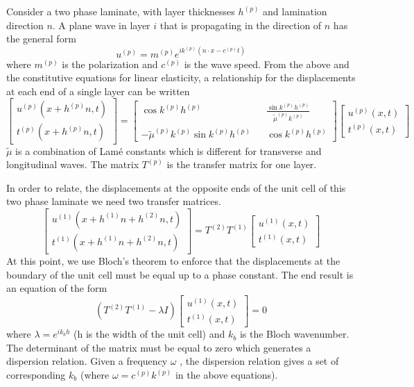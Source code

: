 \documentclass{article}
\begin{document}
Consider a two phase laminate, with layer thicknesses $h^{(p)}$ and lamination 
direction $n$. A plane wave in layer $i$ that is propagating in the direction 
of $n$ has the general form
\begin{equation}
	u^{(p)} = m^{(p)}e^{ik^{(p)}(n\cdot x - c^{(p)} t)}
\end{equation}
where $m^{(p)}$ is the polarization and $c^{(p)}$ is the wave speed. From the 
above and the constitutive equations for linear elasticity, a relationship for 
the displacements at each end of a single layer can be written
\begin{equation} \label{transfeqn}
	\begin{bmatrix}
		u^{(p)}(x+h^{(p)}n,t) \\
		t^{(p)}(x+h^{(p)}n,t)
	\end{bmatrix}
	=
	\begin{bmatrix}
		\cos{ k^{(p)} h^{(p)} } && \frac{\sin{ k^{(p)} h^{(p)} 
		}}{\tilde{\mu}^{(p)}k^{(p)}} \\
		- \tilde{\mu}^{(p)}k^{(p)} \sin{ k^{(p)} h^{(p)} } &&
		\cos{ k^{(p)} h^{(p)}}
	\end{bmatrix}
	\begin{bmatrix}
		u^{(p)}(x,t) \\
		t^{(p)}(x,t)
	\end{bmatrix}
\end{equation}
$\tilde{\mu}$ is a combination of Lam\'e constants which is different for 
transverse and longitudinal waves. The matrix $T^{(p)}$ is the transfer matrix 
for one layer.

In order to relate, the displacements at the opposite ends of the unit cell of 
this two phase laminate we need two transfer matrices.
\begin{equation} \label{transfeqn}
	\begin{bmatrix}
		u^{(1)}(x+h^{(1)}n+h^{(2)}n,t) \\
		t^{(1)}(x+h^{(1)}n+h^{(2)}n,t)
	\end{bmatrix}
	=
	T^{(2)}T^{(1)}
	\begin{bmatrix}
		u^{(1)}(x,t) \\
		t^{(1)}(x,t)
	\end{bmatrix}
\end{equation}
At this point, we use Bloch's theorem to enforce that the displacements at the 
boundary of the unit cell must be equal up to a phase constant. The end result 
is an equation of the form
\begin{equation}
	\left(T^{(2)}T^{(1)} - \lambda I\right)
	\begin{bmatrix}
		u^{(1)}(x,t) \\
		t^{(1)}(x,t)
	\end{bmatrix} = 0
\end{equation}
where $\lambda = e^{ik_bh}$ (h is the width of the unit cell) and $k_b$ is the 
Bloch wavenumber. The determinant of the matrix must be equal to zero which 
generates a dispersion relation. Given a frequency $\omega$ , the dispersion 
relation gives a set of corresponding $k_b$ (where
$\omega=c^{(p)}k^{(p)}$ in the above equations).
\end{document}
